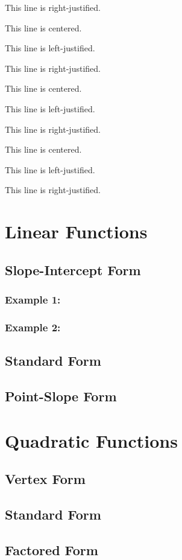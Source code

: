 \documentclass[11pt]{article}
\begin{document}
\begin{flushright}
This line is right-justified.
\end{flushright}


\centering
This line is centered.

This line is left-justified.

This line is right-justified.

\Large
This line is centered.

This line is left-justified.

This line is right-justified.

\tiny
This line is centered.

This line is left-justified.

This line is right-justified.

\section{Linear Functions}
	\subsection{Slope-Intercept Form}
		\subsubsection{Example 1:}
		\subsubsection{Example 2:}	
	\subsection{Standard Form}
	\subsection{Point-Slope Form}
\section{Quadratic Functions}
	\subsection{Vertex Form}
	\subsection{Standard Form}
	\subsection{Factored Form}
\end{document}
